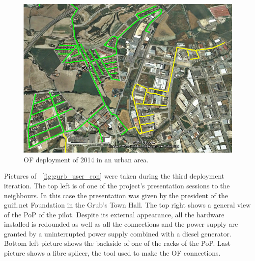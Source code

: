 \begin{figure}[H]
  \centering
  \includegraphics[width=0.95\linewidth]{sect2/figures/map_gurb_2014.jpg}
  \caption[Gurb pilot - OF deployment of 2014 in an urban area]{OF deployment of 2014 in an urban area.}
  \label{fig:map_gurb_2014}
\end{figure}

Pictures of \figurename~\ref{fig:gurb_user_con} were taken during the third deployment iteration. The top left is of one of the project's presentation sessions to the neighbours. In this case the presentation was given by the president of the guifi.net Foundation in the Grub's Town Hall. The top right shows a general view of the PoP of the pilot. Despite its external appearance, all the hardware installed is redounded as well as all the connections and the power supply are granted by a uninterrupted power supply combined with a diesel generator. Bottom left picture shows the backside of one of the racks of the PoP. Last picture shows a fibre splicer, the tool used to make the OF connections.

